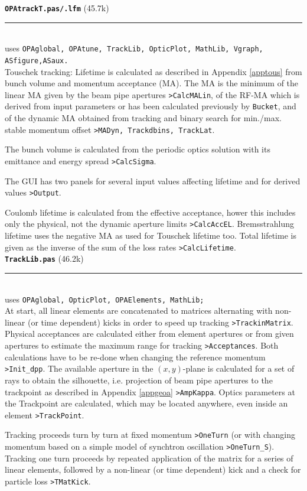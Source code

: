\documentclass[12pt]{article}
\newcommand\code[1]{{\tt #1}}
\newcommand\opamodule[3]{{\bf \tt #1} #2\\  \rule[3pt]{\textwidth}{0.2pt} \\ {\scriptsize uses \tt  #3}\\[1ex]}
\begin{document}
\opamodule{OPAtrackT.pas/.lfm}{(45.7k)}{OPAglobal,  OPAtune, TrackLib, OpticPlot, MathLib, Vgraph, ASfigure,ASaux.}
Touschek tracking: Lifetime is calculated as described in Appendix \ref{apptous} from bunch volume and momentum acceptance (MA). The MA is the minimum of the linear MA given by the beam pipe apertures \code{>CalcMALin}, of the RF-MA which is derived from input parameters or has been calculated previously by {\tt Bucket}, and of the dynamic MA obtained from tracking and binary search for min./max. stable momentum offset \code{>MADyn, Trackdbins, TrackLat}.

The bunch volume is calculated from the periodic optics solution with its emittance and energy spread \code{>CalcSigma}.

The GUI has two panels for several input values affecting lifetime and for derived values \code{>Output}.

Coulomb lifetime is calculated from the effective acceptance, hower this includes only the physical, not the dynamic aperture limits \code{>CalcAccEL}. Bremsstrahlung lifetime uses the negative MA as used for Touschek lifetime too. Total lifetime is given as the inverse of the sum of the loss rates \code{>CalcLifetime}.\\

\opamodule{TrackLib.pas}{(46.2k)}{OPAglobal, OpticPlot, OPAElements, MathLib;}
At start, all linear elements are concatenated to matrices alternating with non-linear (or time dependent) kicks in order to speed up tracking \code{>TrackinMatrix}. Physical acceptances are calculated either from element apertures or from given apertures to estimate the maximum range for tracking \code{>Acceptances}. Both calculations have to be re-done when changing the reference momentum \code{>Init\_dpp}.
The available aperture in the $(x,y)$-plane is calculated for a set of rays to obtain the silhouette, i.e. projection of beam pipe apertures to the trackpoint as described in Appendix \ref{appgeoa} \code{>AmpKappa}. Optics parameters at the Trackpoint are calculated, which may be located anywhere, even inside an element \code{>TrackPoint}.

Tracking proceeds turn by turn at fixed momentum \code{>OneTurn} (or with changing momentum based on a simple model of synchtron oscillation \code{>OneTurn\_S}). Tracking one turn proceeds by repeated application of the matrix for a series of linear elements, followed by a non-linear (or time dependent) kick and a check for particle loss \code{>TMatKick}.
\end{document}
